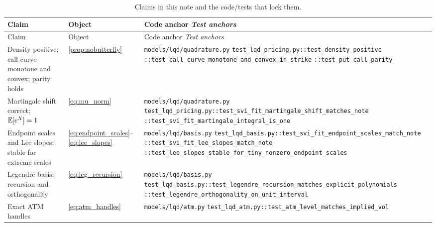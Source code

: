 \documentclass[11pt]{article}
\begin{document}
\begingroup
\small
\setlength{\tabcolsep}{4pt}
\renewcommand{\arraystretch}{1.15}
\begin{longtable}{@{}p{}p{}p{}@{}}
\caption{Claims in this note and the code/tests that lock them.}\\
\toprule Claim & Object & Code anchor \newline \emph{Test anchors}\\ \midrule
\endfirsthead
\toprule Claim & Object & Code anchor \newline \emph{Test anchors}\\ \midrule
\endhead
Density positive; call curve monotone and convex; parity holds &
\cref{prop:nobutterfly} &
\nolinkurl{models/lqd/quadrature.py}\newline
\nolinkurl{test_lqd_pricing.py::test_density_positive}\newline
\nolinkurl{::test_call_curve_monotone_and_convex_in_strike}\newline
\nolinkurl{::test_put_call_parity}\\
\addlinespace
Martingale shift correct; $\mathbb{E}[e^X]=1$ &
\eqref{eq:mu_norm} &
\nolinkurl{models/lqd/quadrature.py}\newline
\nolinkurl{test_lqd_pricing.py::test_svi_fit_martingale_shift_matches_note}\newline
\nolinkurl{::test_svi_fit_martingale_integral_is_one}\\
\addlinespace
Endpoint scales and Lee slopes; stable for extreme scales &
\eqref{eq:endpoint_scales}--\eqref{eq:lee_slopes} &
\nolinkurl{models/lqd/basis.py}\newline
\nolinkurl{test_lqd_basis.py::test_svi_fit_endpoint_scales_match_note}\newline
\nolinkurl{::test_svi_fit_lee_slopes_match_note}\newline
\nolinkurl{::test_lee_slopes_stable_for_tiny_nonzero_endpoint_scales}\\
\addlinespace
Legendre basis: recursion and orthogonality &
\eqref{eq:leg_recursion} &
\nolinkurl{models/lqd/basis.py}\newline
\nolinkurl{test_lqd_basis.py::test_legendre_recursion_matches_explicit_polynomials}\newline
\nolinkurl{::test_legendre_orthogonality_on_unit_interval}\\
\addlinespace
Exact ATM handles &
\eqref{eq:atm_handles} &
\nolinkurl{models/lqd/atm.py}\newline
\nolinkurl{test_lqd_atm.py::test_atm_level_matches_implied_vol}\newline

\end{longtable}
\end{document}

